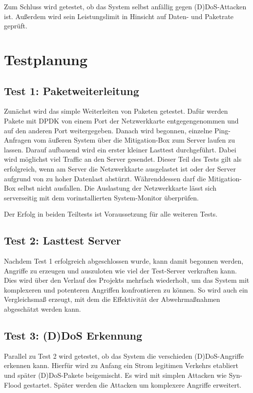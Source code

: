\documentclass[../review_1.tex]{subfiles}
\begin{document}
Zum Schluss wird getestet, ob das System selbst anfällig gegen (D)DoS-Attacken ist. Außerdem wird sein Leistungslimit in Hinsicht auf Daten- und Paketrate geprüft.

\section{Testplanung}
\subsection{Test 1: Paketweiterleitung}
Zunächst wird das simple Weiterleiten von Paketen getestet. Dafür werden Pakete mit DPDK von einem Port der Netzwerkkarte entgegengenommen und auf den anderen Port weitergegeben. Danach wird  begonnen, einzelne Ping-Anfragen vom äußeren System über die Mitigation-Box zum Server laufen zu lassen. Darauf aufbauend wird ein erster kleiner Lasttest durchgeführt. Dabei wird möglichst viel Traffic an den Server gesendet. Dieser Teil des Tests gilt als erfolgreich, wenn am Server die Netzwerkkarte ausgelastet ist oder der Server aufgrund von zu hoher Datenlast abstürzt. Währenddessen darf die Mitigation-Box selbst nicht ausfallen. Die Auslastung der Netzwerkkarte lässt sich serverseitig mit dem vorinstallierten System-Monitor überprüfen. 

Der Erfolg in beiden Teiltests ist Voraussetzung für alle weiteren Tests.

\subsection{Test 2: Lasttest Server}
Nachdem Test 1 erfolgreich abgeschlossen wurde, kann damit begonnen werden, Angriffe zu erzeugen und auszuloten wie viel der Test-Server verkraften kann. Dies wird über den Verlauf des Projekts mehrfach wiederholt, um das System mit komplexeren und potenteren Angriffen konfrontieren zu können. So wird auch ein Vergleichsmaß erzeugt, mit dem die Effektivität der Abwehrmaßnahmen abgeschätzt werden kann.

\subsection{Test 3: (D)DoS Erkennung}
Parallel zu Test 2 wird getestet, ob das System die verschieden (D)DoS-Angriffe erkennen kann. Hierfür wird zu Anfang ein Strom legitimen Verkehrs etabliert und später (D)DoS-Pakete beigemischt. Es wird mit simplen Attacken wie Syn-Flood gestartet. Später werden die Attacken um komplexere Angriffe erweitert.
\end{document}
